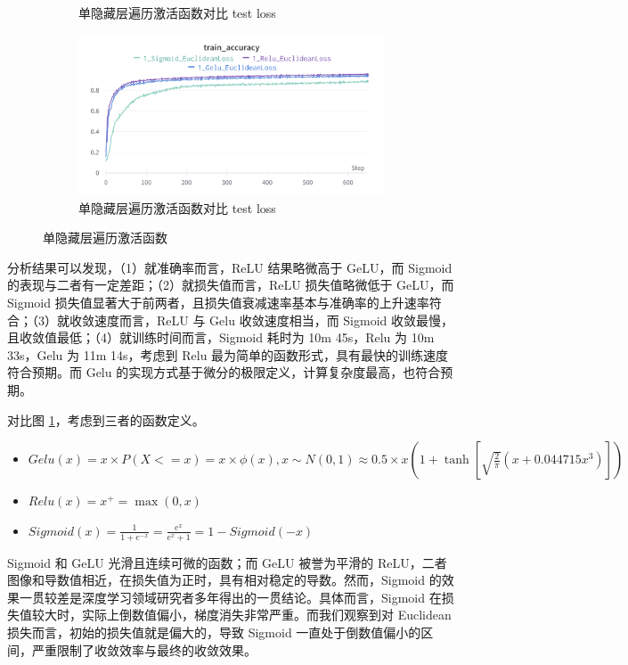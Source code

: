 \documentclass{article}
\begin{document}
\begin{figure}[htbp]
\begin{subfigure}{0.475\textwidth}
		\caption{单隐藏层遍历激活函数对比 test loss}
	\end{subfigure}
	\begin{subfigure}{0.475\textwidth}
		\centering
		\includegraphics[width=1\textwidth]{../pics/单层激活函数train_acc.png}
		\caption{单隐藏层遍历激活函数对比 test loss}
	\end{subfigure}
	\caption{单隐藏层遍历激活函数}
	\label{fig:5}
\end{figure}

分析结果可以发现，（1）就准确率而言，ReLU 结果略微高于 GeLU，而 Sigmoid 的表现与二者有一定差距；（2）就损失值而言，ReLU 损失值略微低于 GeLU，而 Sigmoid 损失值显著大于前两者，且损失值衰减速率基本与准确率的上升速率符合；（3）就收敛速度而言，ReLU 与 Gelu 收敛速度相当，而 Sigmoid 收敛最慢，且收敛值最低；（4）就训练时间而言，Sigmoid 耗时为 10m 45s，Relu 为 10m 33s，Gelu 为 11m 14s，考虑到 Relu 最为简单的函数形式，具有最快的训练速度符合预期。而 Gelu 的实现方式基于微分的极限定义，计算复杂度最高，也符合预期。

对比图 \ref{fig:5}，考虑到三者的函数定义。
\begin{itemize}
    \item $Gelu(x)=x \times P(X<=x)=x \times \phi(x), x \sim N(0,1) \approx  0.5 \times x\left(1+\tanh \left[\sqrt{\frac{2}{\pi}}\left(x+0.044715 x^3\right)\right]\right)$
    \item $Relu(x)=x^{+}=\max (0, x)$
    \item $Sigmoid(x)=\frac{1}{1+e^{-x}}=\frac{e^x}{e^x+1}=1-Sigmoid(-x)$
\end{itemize}

Sigmoid 和 GeLU 光滑且连续可微的函数；而 GeLU 被誉为平滑的 ReLU，二者图像和导数值相近，在损失值为正时，具有相对稳定的导数。然而，Sigmoid 的效果一贯较差是深度学习领域研究者多年得出的一贯结论。具体而言，Sigmoid 在损失值较大时，实际上倒数值偏小，梯度消失非常严重。而我们观察到对 Euclidean 损失而言，初始的损失值就是偏大的，导致 Sigmoid 一直处于倒数值偏小的区间，严重限制了收敛效率与最终的收敛效果。
\end{document}
